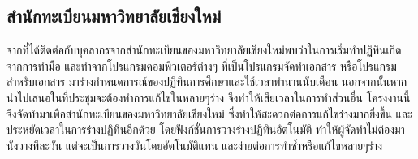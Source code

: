     \subsection{สำนักทะเบียนมหาวิทยาลัยเชียงใหม่ }
    จากที่ได้ติดต่อกับบุคลากรจากสำนักทะเบียนของมหาวิทยาลัยเชียงใหม่พบว่าในการเริ่มทำปฏิทินเกิดจากการทำมือ และทำจากโปรแกรมคอมพิวเตอร์ต่างๆ ที่เป็นโปรแกรมจัดทำเอกสาร
%
หรือโปรแกรมสำหรับเอกสาร มาร่างกำหนดการณ์ของปฏิทินการศึกษาและใช้เวลาทำนานนับเดือน นอกจากนั้นหากนำไปเสนอในที่ประชุมจะต้องทำการแก้ไขในหลายๆร่าง จึงทำให้เสียเวลาในการทำส่วนอื่น
%
โครงงานนี้จึงจัดทำมาเพื่อสำนักทะเบียนของมหาวิทยาลัยเชียงใหม่ ซึ่งทำให้สะดวกต่อการแก้ไขร่างมากยิ่งขึ้น และประหยัดเวลาในการร่างปฏิทินอีกด้วย โดยฟังก์ชั่นการวางร่างปฏิทินอัตโนมัติ ทำให้ผู้จัดทำไม่ต้องมานั่งวางทีละวัน แต่จะเป็นการวางวันโดยอัตโนมัติแทน และง่ายต่อการทำซ้ำหรือแก้ไขหลายๆร่าง

